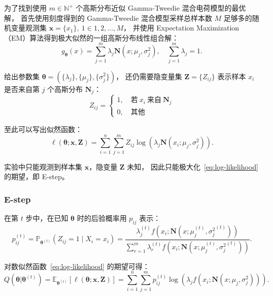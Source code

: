 为了找到使用 $m\in\mathbb{N}^{+}$ 个高斯分布近似 Gamma-Tweedie 混合电荷模型的最优解，
首先使用刻度得到的 Gamma-Tweedie 混合模型采样总样本数 $M$ 足够多的随机变量观测集 $\boldsymbol{x}=\{x_1\},\ 1\in{1, 2, \ldots, M}$，
并使用 Expectation Maximization（EM）算法得到极大似然的一组高斯分布线性组合解：
\begin{equation}
    g_{\boldsymbol{\theta}}(x)=\sum_{j=1}^m\lambda_j\mathbf{N}(x;\mu_j, \sigma_j^2),\quad\sum_{j=1}^{m}\lambda_j=1.
\end{equation}

给出参数集 $\boldsymbol{\theta}=(\{\lambda_{j}\},\{\mu_j\},\{\sigma_j^2\})$，
还仍需要隐变量集 $\boldsymbol{Z}=\{Z_{ij}\}$ 表示样本 $x_i$ 是否来自第 $j$ 个高斯分布 $\mathbf{N}_j$：
\begin{equation}
    Z_{ij}=
    \begin{cases}
    1,\quad\text{若}\ x_i\ \text{来自}\ \mathbf{N}_j \\
    0,\quad\text{其他}
    \end{cases}
\end{equation}

至此可以写出似然函数：
\begin{equation}
    \label{eq:log-likelihood}
    \ell(\boldsymbol{\theta};\mathbf{x},\mathbf{Z})=
    \sum_{i=1}^n\sum_{j=1}^mZ_{ij}\log\left(\lambda_j\mathbf{N}(x_i;\mu_j, \sigma_j^2)\right).
\end{equation}

实验中只能观测到样本集 $\boldsymbol{x}$，隐变量 $\boldsymbol{Z}$ 未知，
因此只能极大化~\eqref{eq:log-likelihood} 的期望，即 E-step。

\subsubsection{E-step}
在第 $t$ 步中，在已知 $\boldsymbol{\theta}$ 时的后验概率用 $p_{ij}$ 表示：
\begin{equation}
    p_{ij}^{(t)}=\mathbb{P}_{\boldsymbol{\theta}^{(t)}}\left(Z_{ij}=1
    \mid X_i=x_i\right)=\frac{\lambda_j^{(t)}f(x_i;\mathbf{N}(x;\mu_j^{(t)}, {\sigma_j^2}^{(t)}))}
    {\sum_{r=1}^m\lambda_r^{(t)}f(x_i;\mathbf{N}(x;\mu_j^{(t)}, {\sigma_j^2}^{(t)}))}.
\end{equation}

对数似然函数~\eqref{eq:log-likelihood} 的期望可得：
\begin{equation}
    \label{eq:em_expectation}
    Q(\boldsymbol{\theta}|\boldsymbol{\theta}^{(t)})=
    \mathbb{E}_{\boldsymbol{\theta}^{(t)}}\left[\ell(\boldsymbol{\theta};
    \mathbf{x},\mathbf{Z})\right]=
    \sum_{i=1}^n\sum_{j=1}^mp_{ij}^{(t)}\log\left(\lambda_jf(x_i;\mathbf{N}(x;\mu_j, \sigma_j^2))\right).
\end{equation}

